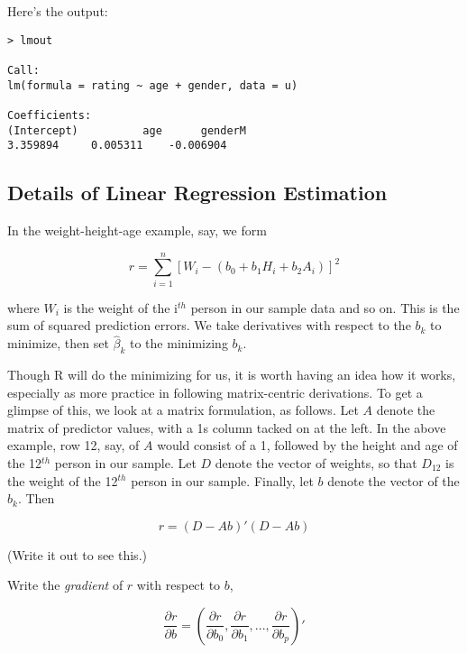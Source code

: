 Here's the output:

\begin{lstlisting}
> lmout

Call:
lm(formula = rating ~ age + gender, data = u)

Coefficients:
(Intercept)          age      genderM  
3.359894     0.005311    -0.006904  
\end{lstlisting}

\subsection{Details of Linear Regression Estimation}
\label{lmdetails}

In the weight-height-age example, say, we form 

\begin{equation}
\label{rss}
r =
\sum_{i=1}^n [W_i - (b_0 + b_1 H_i + b_2 A_i)]^2
\end{equation}

where $W_i$ is the weight of the i$^{th}$ person in our sample data and
so on. This is the sum of squared prediction errors.  We take derivatives
with respect to the $b_k$ to minimize, then set $\widehat{\beta}_k$ to
the minimizing $b_k$.  

Though R will do the minimizing for us, it is worth having an idea how
it works, especially as more practice in following matrix-centric
derivations.  To get a glimpse of this, we look at a matrix formulation, as
follows.  Let $A$ denote the matrix of predictor values, with a 1s
column tacked on at the left.  In the above example, row 12, say, of $A$
would consist of a 1, followed by the height and age of the 12$^{th}$
person in our sample.  Let $D$ denote the vector of weights, so that
$D_{12}$ is the weight of the 12$^{th}$ person in our sample.  Finally,
let $b$ denote the vector of the $b_k$.  Then

\begin{equation}
\label{}
r = (D - A b)' (D - Ab)
\end{equation}

(Write it out to see this.)

Write the \textit{gradient} of $r$ with respect to $b$,

\begin{equation}
\frac{\partial r}{\partial b} = (
\frac{\partial r}{\partial b_0},
\frac{\partial r}{\partial b_1},
...,
\frac{\partial r}{\partial b_p}
)'
\end{equation}


